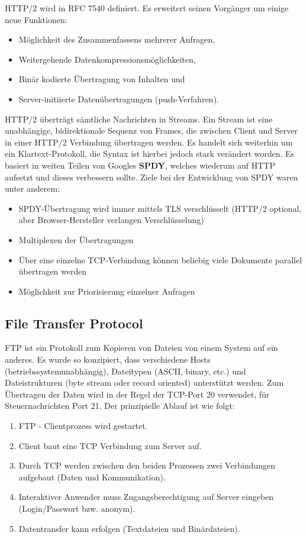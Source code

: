\documentclass{article} %
\begin{document}
HTTP/2 wird in RFC 7540\cite{rfc7540} definiert.
Es erweitert seinen Vorgänger um einige neue Funktionen:
\begin{itemize}
	\item Möglichkeit des Zusammenfassens mehrerer Anfragen,
	\item Weitergehende Datenkompressionsmöglichkeiten,
	\item Binär kodierte Übertragung von Inhalten und
	\item Server-initiierte Datenübertragungen (push-Verfahren).
\end{itemize}
HTTP/2 überträgt sämtliche Nachrichten in Streams.
Ein Stream ist eine unabhängige, bidirektionale Sequenz von Frames, die zwischen Client und Server in einer HTTP/2 Verbindung übertragen werden. 
Es handelt sich weiterhin um ein Klartext-Protokoll, die Syntax ist hierbei jedoch stark verändert worden.
Es basiert in weiten Teilen von Googles \textbf{SPDY}, welches wiederum auf HTTP aufsetzt und dieses verbessern sollte.
Ziele bei der Entwicklung von SPDY waren unter anderem:
\begin{itemize}
	\item SPDY-Übertragung wird immer mittels TLS verschlüsselt	(HTTP/2 optional, aber Browser-Hersteller verlangen Verschlüsselung)
	\item Multiplexen der Übertragungen
	\item Über eine einzelne TCP-Verbindung können beliebig viele Dokumente parallel übertragen werden
	\item Möglichkeit zur Priorisierung einzelner Anfragen
\end{itemize}

\subsection{File Transfer Protocol}

FTP\cite{rfc959} ist ein Protokoll zum Kopieren von Dateien von einem System auf ein anderes.
Es wurde so konzipiert, dass verschiedene Hosts (betriebssystemunabhängig), Dateitypen (ASCII, binary, etc.) und Dateistrukturen (byte stream oder record oriented) unterstützt werden.
Zum Übertragen der Daten wird in der Regel der TCP-Port 20 verwendet, für Steuernachrichten Port 21.
Der prinzipielle Ablauf ist wie folgt:
\begin{enumerate}
	\item FTP - Clientprozess wird gestartet.
	\item Client baut eine TCP Verbindung zum Server auf.
	\item Durch TCP werden zwischen den beiden Prozessen zwei Verbindungen aufgebaut (Daten und Kommunikation).
	\item Interaktiver Anwender muss Zugangsberechtigung auf Server eingeben (Login/Passwort bzw. anonym).
	\item Datentransfer kann erfolgen (Textdateien und Binärdateien).
\end{enumerate}
\end{document}

